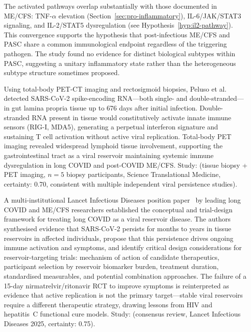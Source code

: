 The activated pathways overlap substantially with those documented in ME/CFS: TNF-$\alpha$ elevation (Section~\ref{sec:pro-inflammatory}), IL-6/JAK/STAT3 signaling, and IL-2/STAT5 dysregulation (see Hypothesis~\ref{hyp:il2-pathway}). This convergence supports the hypothesis that post-infectious ME/CFS and PASC share a common immunological endpoint regardless of the triggering pathogen. The study found no evidence for distinct biological subtypes within PASC, suggesting a unitary inflammatory state rather than the heterogeneous subtype structure sometimes proposed.

\begin{achievement}
\label{ach:peluso2024-viral-persistence}
Using total-body PET-CT imaging and rectosigmoid biopsies, Peluso et al.~\cite{Peluso2024ViralPersistence} detected SARS-CoV-2 spike-encoding RNA---both single- and double-stranded---in gut lamina propria tissue up to 676 days after initial infection. Double-stranded RNA present in tissue would constitutively activate innate immune sensors (RIG-I, MDA5), generating a perpetual interferon signature and sustaining T cell activation without active viral replication. Total-body PET imaging revealed widespread lymphoid tissue involvement, supporting the gastrointestinal tract as a viral reservoir maintaining systemic immune dysregulation in long COVID and post-COVID ME/CFS.
Study: (tissue biopsy + PET imaging, $n=5$ biopsy participants, Science Translational Medicine, certainty: 0.70, consistent with multiple independent viral persistence studies).
\end{achievement}

\begin{achievement}
\label{ach:proal2025-reservoir-framework}
A multi-institutional Lancet Infectious Diseases position paper~\cite{Proal2025Reservoir}
by leading long COVID and ME/CFS researchers established the conceptual and trial-design
framework for treating long COVID as a viral reservoir disease. The authors synthesised
evidence that SARS-CoV-2 persists for months to years in tissue reservoirs in affected
individuals, propose that this persistence drives ongoing immune activation and symptoms,
and identify critical design considerations for reservoir-targeting trials: mechanism of
action of candidate therapeutics, participant selection by reservoir biomarker burden,
treatment duration, standardised measurables, and potential combination approaches.
The failure of a 15-day nirmatrelvir/ritonavir RCT to improve symptoms is reinterpreted
as evidence that active replication is not the primary target---stable viral reservoirs
require a different therapeutic strategy, drawing lessons from HIV and hepatitis~C
functional cure models.
Study: (consensus review, Lancet Infectious Diseases 2025, certainty: 0.75).
\end{achievement}

